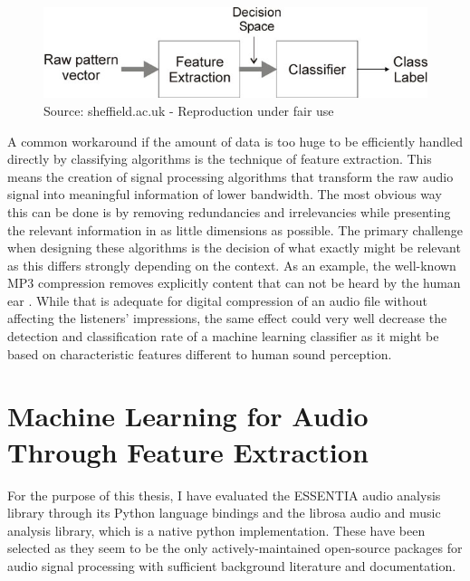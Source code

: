 \begin{figure}[h]
    \centering
	\includegraphics[width=.8\textwidth]{./images/illustrations/pipeline-fe}
    \caption{Source: sheffield.ac.uk - Reproduction under fair use}
    \label{fig:pipeline-fe}
\end{figure}


A common workaround if the amount of data is too huge to be efficiently handled directly by classifying algorithms is the technique of feature extraction. This means the creation of signal processing algorithms that transform the raw audio signal into meaningful information of lower bandwidth. The most obvious way this can be done is by removing redundancies and irrelevancies while presenting the relevant information in as little dimensions as possible. The primary challenge when designing these algorithms is the decision of what exactly might be relevant as this differs strongly depending on the context.
As an example, the well-known MP3 compression removes explicitly content that can not be heard by the human ear \cite{brandenburg1999mp3}. While that is adequate for digital compression of an audio file without affecting the listeners' impressions, the same effect could very well decrease the detection and classification rate of a machine learning classifier as it might be based on characteristic features different to human sound perception.  


\section{Machine Learning for Audio Through Feature Extraction}
\label{mlfatefe}







For the purpose of this thesis, I have evaluated the ESSENTIA audio analysis library \cite{bogdanov:Essentia:ACMMULTIMEDIA13} through its Python language bindings and the librosa audio and music analysis library\cite{BMcFee:librosa}, which is a native python implementation. 
These have been selected as they seem to be the only actively-maintained open-source packages for audio signal processing with sufficient background literature and documentation. 

